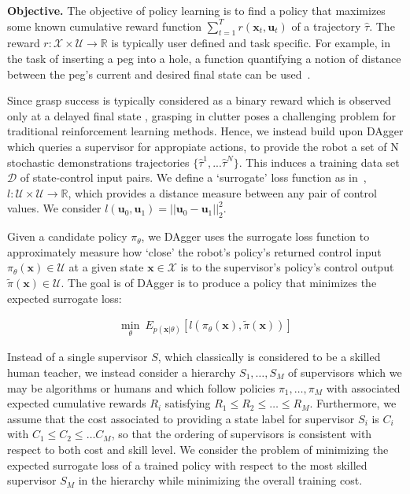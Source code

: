 \documentclass[10pt, conference]{ieeeconf}      %
\newcommand{\bu}{\mathbf{u}}
\newcommand{\bx}{\mathbf{x}}
\begin{document}
\noindent\textbf{Objective.} The objective of policy learning is to find a policy that maximizes some known cumulative
reward function $\sum^T_{t=1} r(\bx_t,\bu_t)$ of a trajectory $\hat{\tau}$. The reward $r:\mathcal{X}\times
\mathcal{U}\to \mathbb{R}$ is typically user defined and task specific. 
For example, in the task of inserting a peg into a hole, a function quantifying a notion of distance between the peg's
current and desired final state can be used~\cite{levine2015end}.  

Since grasp success is typically considered as a binary reward which is observed only at a delayed final state \cite{kitaevphysics}, 
grasping in clutter poses a challenging problem for traditional reinforcement learning methods. Hence, we instead build
upon DAgger which queries a supervisor for appropiate actions, to provide the robot a set of N stochastic demonstrations trajectories $\lbrace \hat{\tau}^1,...\hat{\tau}^N \rbrace$. This induces a training data set $\mathcal{D}$ of state-control input pairs. 
We define a `surrogate' loss function as in~\cite{ross2010reduction}, $l:\mathcal{U}\times \mathcal{U}\to \mathbb{R}$, which provides a distance
measure between any pair of control values. We consider $l(\bu_0,\bu_1) = ||\bu_0-\bu_1||^2_2$.

Given a candidate policy $\pi_{\theta}$, we DAgger uses the surrogate loss function to approximately measure how `close' the robot's policy's
returned control input $\pi_{\theta}(\bx)\in \mathcal{U}$ at a given state $\bx\in \mathcal{X}$ is to the supervisor's policy's control output
$\tilde{\pi}(\bx)\in \mathcal{U}$. The goal is of DAgger is to produce a policy that minimizes the expected surrogate loss:


 \vspace{-2ex}
\begin{align}\label{eq:LFD_obj}
\underset{\theta}{\min} \: E_{p(\bx|\theta)} [l(\pi_\theta(\bx),\tilde{\pi}(\bx))]
\end{align}

Instead of a single supervisor $S$, which classically is considered to be a skilled human teacher, we instead consider a
hierarchy $S_1, \ldots, S_M$ of supervisors which we may be algorithms or humans and which follow policies $\pi_1, \ldots, \pi_M$ with
associated expected cumulative rewards $R_i$ satisfying $R_1\le R_2 \le \ldots \le
R_M$. Furthermore, we assume that the cost associated to providing a state
label for supervisor $S_i$ is $C_i$ with $C_1\le C_2 \le \ldots C_M$, so that the ordering of supervisors is consistent
with respect to both cost and skill level. We consider the problem of minimizing the expected surrogate loss of a
trained policy with respect to the most skilled supervisor $S_M$ in the hierarchy while minimizing the overall training
cost.
\end{document}

